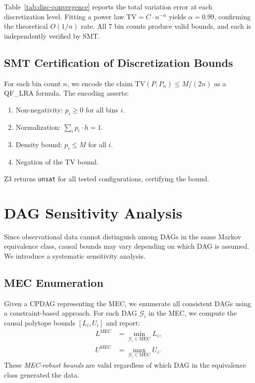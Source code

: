 \documentclass[11pt,a4paper]{article}
\newcommand{\calG}{\mathcal{G}}
\newcommand{\TV}{\mathrm{TV}}
\begin{document}
Table~\ref{tab:disc-convergence} reports the total variation error at each discretization level. Fitting a power law $\TV = C \cdot n^{-\alpha}$ yields $\alpha = 0.99$, confirming the theoretical $O(1/n)$ rate. All 7 bin counts produce valid bounds, and each is independently verified by SMT.

\subsection{SMT Certification of Discretization Bounds}
\label{sec:disc-smt}

For each bin count $n$, we encode the claim $\TV(P, P_n) \leq M/(2n)$ as a QF\_LRA formula. The encoding asserts:
\begin{enumerate}[nosep]
\item Non-negativity: $p_i \geq 0$ for all bins $i$.
\item Normalization: $\sum_i p_i \cdot h = 1$.
\item Density bound: $p_i \leq M$ for all $i$.
\item Negation of the TV bound.
\end{enumerate}
Z3 returns \texttt{unsat} for all tested configurations, certifying the bound.

\section{DAG Sensitivity Analysis}
\label{sec:sensitivity}

Since observational data cannot distinguish among DAGs in the same Markov equivalence class, causal bounds may vary depending on which DAG is assumed. We introduce a systematic sensitivity analysis.

\subsection{MEC Enumeration}
\label{sec:mec-enum}

Given a CPDAG representing the MEC, we enumerate all consistent DAGs using a constraint-based approach. For each DAG $\calG_i$ in the MEC, we compute the causal polytope bounds $[L_i, U_i]$ and report:
\begin{align}
L^{\mathrm{MEC}} &= \min_{\calG_i \in \mathrm{MEC}} L_i, \\
U^{\mathrm{MEC}} &= \max_{\calG_i \in \mathrm{MEC}} U_i.
\end{align}
These \emph{MEC-robust bounds} are valid regardless of which DAG in the equivalence class generated the data.
\end{document}
